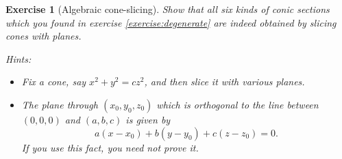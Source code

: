 \documentclass[a4paper,leqno,10pt]{article}
\theoremstyle{exercise}
\newtheorem{Exercise}{Exercise}
\newenvironment{exercise}
  {\begin{mdframed}\begin{Exercise}}
  {\end{Exercise}\end{mdframed}}
\theoremstyle{plain}
\theoremstyle{definition}
\theoremstyle{remark}
\begin{document}
\begin{exercise}[Algebraic cone-slicing]
  Show that all six kinds of conic sections which you found in exercise \ref{exercise:degenerate} are indeed obtained by
  slicing cones with planes.

  \textit{Hints:}
  \begin{itemize}
    \item Fix a cone, say $ x^2 + y^2 = cz^2 $, and then slice it with various planes.
    \item The plane through $ (x_0, y_0, z_0) $ which is orthogonal to the line between $ (0,0,0) $ and $ (a,b,c) $ is given by
          \begin{displaymath}
            a(x-x_0) + b(y-y_0) + c(z-z_0) = 0.
          \end{displaymath}
          If you use this fact, you need not prove it.
  \end{itemize}
\end{exercise}
\end{document}
